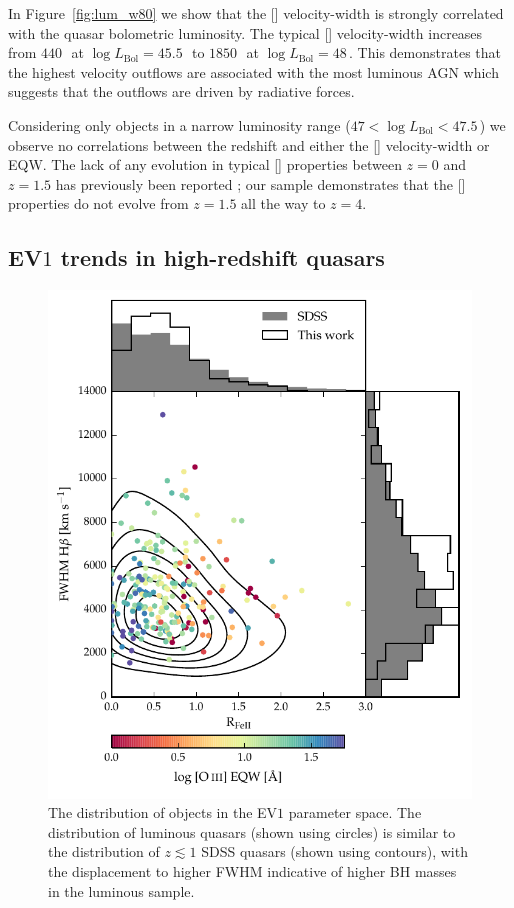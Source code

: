 In Figure~\ref{fig:lum_w80} we show that the [] velocity-width is strongly correlated with the quasar bolometric luminosity.
The typical [] velocity-width increases from $440$\,\kms\, at $\log L_{\text{Bol}}=45.5$\,\ergs\, to $1850$\,\kms\, at $\log L_{\text{Bol}}=48$\,\ergs.
This demonstrates that the highest velocity outflows are associated with the most luminous AGN which suggests that the outflows are driven by radiative forces.

Considering only objects in a narrow luminosity range ($47 < \log L_{\text{Bol}} < 47.5$\,\ergs) we observe no correlations between the redshift and either the [] velocity-width or EQW.
The lack of any evolution in typical [] properties between $z=0$ and $z=1.5$ has previously been reported \citep[e.g.][]{harrison16}; our sample demonstrates that the [] properties do not evolve from $z=1.5$ all the way to $z=4$.

\subsection{EV$1$ trends in high-redshift quasars}

\begin{figure}[t!]
\centering
    \includegraphics[width=\columnwidth]{figures/chapter04/ev1_lowz.pdf}
    \caption[{The distribution of objects in the EV$1$ parameter space.}]{The distribution of objects in the EV$1$ parameter space. The distribution of luminous quasars (shown using circles) is similar to the distribution of $z \lesssim 1$ SDSS quasars (shown using contours), with the displacement to higher \hb FWHM indicative of higher BH masses in the luminous sample.}
    \label{fig:ev1_lowz}
\end{figure}

